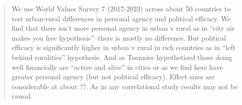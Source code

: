 \documentclass[10pt, letterpaper]{article}
\begin{document}
\begin{abstract}
  \noindent We use World Values Survey 7 (2017-2023) across about 50 countries
  to test urban-rural differences in personal agency and political efficacy.  
%
%
  We find that there isn't more personal agency in urban v rural as
  in ``city air makes you free hypothesis''--there is mostly no difference. But political
  efficacy is significantly higher in urban v rural in rich countries as in ``left
  behind ruralities'' hypothesis. And as Toennies hypothetised 
  those doing well financially are ``active and alive'' in cities or as we find here have
  greater personal agency (but not political efficacy). Effect sizes are
  considerable at about ??. As in any correlational study results may not be
  causal. 
    

\end{abstract}
\vspace{.15in} 
\vspace{.25in} 
\end{document}
